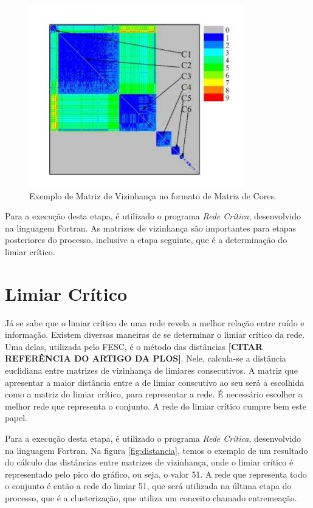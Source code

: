 \begin{figure}
\centering
\includegraphics[scale=0.53]{matriz-vizinhanca}
\caption{Exemplo de Matriz de Vizinhança no formato de Matriz de Cores.}
\label{fig:matriz-vizinhanca}
\end{figure}

Para a execução desta etapa, é utilizado o programa \textit{Rede Crítica}, desenvolvido na linguagem Fortran. As matrizes de vizinhança são importantes para
etapas posteriores do processo, inclusive a etapa seguinte, que é a determinação do limiar crítico.

\section{Limiar Crítico} \label{sec:limcrit}

Já se sabe que o limiar crítico de uma rede revela a melhor relação entre ruído e informação. Existem diversas maneiras de se determinar o limiar
crítico da rede. Uma delas, utilizada pelo FESC, é o método das distâncias \textbf{[CITAR REFERÊNCIA DO ARTIGO DA PLOS]}. Nele, calcula-se a
distância euclidiana entre matrizes de vizinhança de limiares consecutivos. A matriz que apresentar a maior distância entre a de limiar conscutivo
ao seu será a escolhida como a matriz do limiar crítico, para representar a rede. É necessário escolher a melhor rede que representa o conjunto.
A rede do limiar crítico cumpre bem este papel.

Para a execução desta etapa, é utilizado o programa \textit{Rede Crítica}, desenvolvido na linguagem Fortran. Na figura \ref{fig:distancia}, temos o
exemplo de um resultado do cálculo das distâncias entre matrizes de vizinhança, onde o limiar crítico é representado pelo pico do gráfico, ou seja,
o valor 51. A rede que representa todo o conjunto é então a rede do limiar 51, que será utilizada na última etapa do processo, que é a clusterização,
que utiliza um conceito chamado entremeação.

